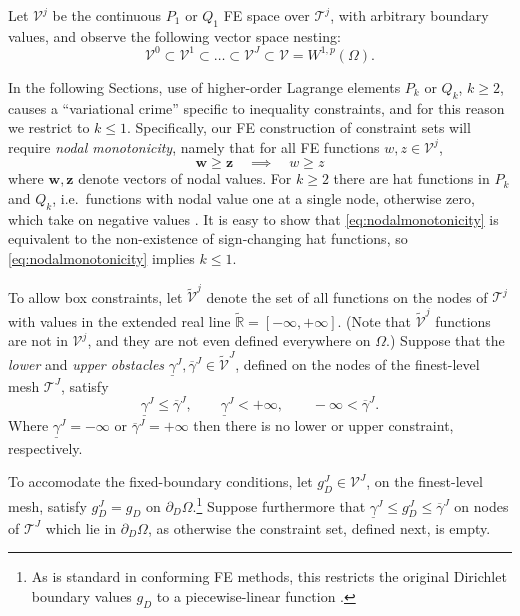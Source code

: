 \documentclass[letterpaper,final,12pt,reqno]{amsart}
\theoremstyle{cstyle}
\theoremstyle{cstyle*}
\theoremstyle{dstyle}
\numberwithin{equation}{section}
\numberwithin{figure}{section}
\numberwithin{table}{section}
\numberwithin{theorem}{section}
\newcommand{\RR}{\mathbb{R}}
\newcommand{\bw}{\mathbf{w}}
\newcommand{\bz}{\mathbf{z}}
\begin{document}
Let $\mathcal{V}^j$ be the continuous $P_1$ or $Q_1$ FE space \cite{Elmanetal2014} over $\mathcal{T}^j$, with arbitrary boundary values, and observe the following vector space nesting:
\begin{equation}
\mathcal{V}^0 \subset \mathcal{V}^1 \subset \dots \subset \mathcal{V}^J \subset \mathcal{V}=W^{1,p}(\Omega).  \label{eq:fe:nestedspaces}
\end{equation}

In the following Sections, use of higher-order Lagrange elements $P_k$ or $Q_k$, $k\ge 2$, causes a ``variational crime'' \cite[Chapter 10]{BrennerScott2007} specific to inequality constraints, and for this reason we restrict to $k\le 1$.  Specifically, our FE construction of constraint sets will require \emph{nodal monotonicity}, namely that for all FE functions $w,z \in \mathcal{V}^j$,
\begin{equation}
\bw \ge \bz \quad \implies \quad w \ge z \label{eq:nodalmonotonicity}
\end{equation}
where $\bw,\bz$ denote vectors of nodal values.  For $k\ge 2$ there are hat functions in $P_k$ and $Q_k$, i.e.~functions with nodal value one at a single node, otherwise zero, which take on negative values \cite[Figure 1.7]{Elmanetal2014}.  It is easy to show that \eqref{eq:nodalmonotonicity} is equivalent to the non-existence of sign-changing hat functions, so \eqref{eq:nodalmonotonicity} implies $k\le 1$.

To allow box constraints, let $\tilde{\mathcal{V}}^j$ denote the set of all functions on the nodes of $\mathcal{T}^j$ with values in the extended real line $\tilde{\RR} = [-\infty,+\infty]$.  (Note that $\tilde{\mathcal{V}}^j$ functions are not in $\mathcal{V}^j$, and they are not even defined everywhere on $\Omega$.)  Suppose that the \emph{lower} and \emph{upper obstacles} $\underline{\gamma}^J, \overline{\gamma}^J \in \tilde{\mathcal{V}}^J$, defined on the nodes of the finest-level mesh $\mathcal{T}^J$, satisfy
\begin{equation}
\underline{\gamma}^J \le \overline{\gamma}^J, \qquad \underline{\gamma}^J < +\infty, \qquad -\infty < \overline{\gamma}^J. \label{eq:fe:boxconstraintrequirements}
\end{equation}
Where $\underline{\gamma}^J=-\infty$ or $\overline{\gamma}^J=+\infty$ then there is no lower or upper constraint, respectively.

To accomodate the fixed-boundary conditions, let $g_D^J \in \mathcal{V}^J$, on the finest-level mesh, satisfy $g_D^J = g_D$ on $\partial_D \Omega$.\footnote{As is standard in conforming FE methods, this restricts the original Dirichlet boundary values $g_D$ to a piecewise-linear function \cite{Elmanetal2014}.}  Suppose furthermore that $\underline{\gamma}^J \le g_D^J \le \overline{\gamma}^J$ on nodes of $\mathcal{T}^J$ which lie in $\partial_D \Omega$, as otherwise the constraint set, defined next, is empty.
\end{document}
